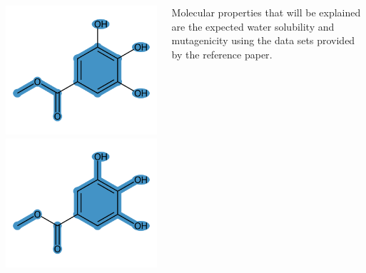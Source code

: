\documentclass[14pt, a2paper, portrait]{tikzposter}
\begin{document}
\begin{columns}
{		\begin{tikzfigure}
			\includegraphics[scale=0.7]{../data/images/example_functional_groups.png}
			\includegraphics[scale=0.7]{../data/images/example_brics.png}
		\end{tikzfigure}

        Molecular properties that will be explained are the expected water solubility 
        and mutagenicity using the data sets provided by the reference paper\cite{wu2023chemistry}.
	}

    
	 {
		\vspace{-0.5cm}
		
	}

\end{columns}
\end{document}
